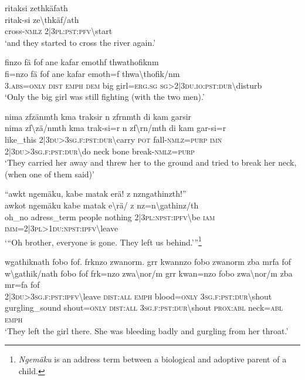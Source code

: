 \ea\label{ex:5:a1576}
ritaksi zethkäfath\\
\gll ritak-si	ze{\textbackslash}thkäf/ath\\
     cross-\textsc{nmlz}	2|3\textsc{pl}:\textsc{pst}:\textsc{pfv}{\textbackslash}start\\
\glt `and they started to cross the river again.'
\z

\ea\label{ex:5:a1577}
finzo fä fof ane kafar emothf thwathofiknm\\
\gll fi=nzo	fä	fof	ane	kafar	emoth=f	thwa{\textbackslash}thofik/nm\\
     3.\textsc{abs}=\textsc{only}	\textsc{dist}	\textsc{emph}	\textsc{dem}	big	girl=\textsc{erg}.\textsc{sg}	\textsc{sg}>2|3\textsc{du}.\textsc{io}:\textsc{pst}:\textsc{dur}{\textbackslash}disturb\\
\glt `Only the big girl was still fighting (with the two men).'
\z

\ea\label{ex:5:a1578}
nima zfzänmth kma traksir n zfrnmth di kam garsir\\
\gll nima	zf{\textbackslash}zä/nmth	kma	trak-si=r	n	zf{\textbackslash}rn/mth	di	kam	gar-si=r\\
     like\_this	2|3\textsc{du}>3\textsc{sg}.\textsc{f}:\textsc{pst}:\textsc{dur}{\textbackslash}carry	\textsc{pot}	fall-\textsc{nmlz}=\textsc{purp}	\textsc{imn}	2|3\textsc{du}>3\textsc{sg}.\textsc{f}:\textsc{pst}:\textsc{dur}{\textbackslash}do	neck	bone	break-\textsc{nmlz}=\textsc{purp}\\
\glt `They carried her away and threw her to the ground and tried to break her neck, (when one of them said)'
\z

\ea\label{ex:5:a1579}
``awkt ngemäku, kabe matak erä! z nzngathinzth!''\\
\gll awkot	ngemäku	kabe	matak	e{\textbackslash}rä/	z	nz=n{\textbackslash}gathinz/th\\
     oh\_no	adress\_term	people	nothing	2|3\textsc{pl}:\textsc{npst}:\textsc{ipfv}{\textbackslash}be	\textsc{iam}	\textsc{imm}=2|3\textsc{pl}>1\textsc{du}:\textsc{npst}:\textsc{ipfv}{\textbackslash}leave\\
\glt `{``}Oh brother, everyone is gone. They left us behind.'''\footnote{\textit{Ngemäku} is an address term between a biological and adoptive parent of a child.}
\z

\ea\label{ex:5:a1581}
wgathiknath fobo fof. frknzo zwanorm. grr kwannzo fobo zwanorm zba mrfa fof\\
\gll w{\textbackslash}gathik/nath	fobo	fof	frk=nzo	zwa{\textbackslash}nor/m	grr	kwan=nzo	fobo	zwa{\textbackslash}nor/m	zba	mr=fa	fof\\
     2|3\textsc{du}>3\textsc{sg}.\textsc{f}:\textsc{pst}:\textsc{ipfv}{\textbackslash}leave	\textsc{dist}:\textsc{all}	\textsc{emph}	blood=\textsc{only}	3\textsc{sg}.\textsc{f}:\textsc{pst}:\textsc{dur}{\textbackslash}shout	gurgling\_sound	shout=\textsc{only}	\textsc{dist}:\textsc{all}	3\textsc{sg}.\textsc{f}:\textsc{pst}:\textsc{dur}{\textbackslash}shout	\textsc{prox}:\textsc{abl}	neck=\textsc{abl}	\textsc{emph}\\
\glt `They left the girl there. She was bleeding badly and gurgling from her throat.'
\z

